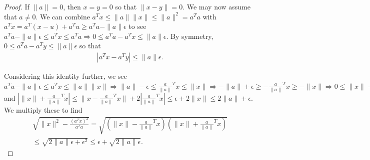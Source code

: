 \begin{proof}

If $\|a\| = 0$, then $x = y = 0$ so that $\|x - y\| = 0$.
We may now assume that $a \ne 0$.
We can combine
$
a^Tx  \le \|a\| \|x\| \le \|a\|^2 = a^T a
$
with
$
a^Tx = a^T(x - u) + a^T u \ge a^Ta - \|a\| \epsilon
$
to see
$
a^Ta - \|a\|\epsilon \le a^Tx \le a^Ta \Longrightarrow 0 \le a^Ta - a^Tx \le \|a\| \epsilon.
$
By symmetry, $0 \le a^Ta - a^Ty \le \|a\| \epsilon$ so that
\begin{align*}
\left| a^Tx - a^Ty \right| \le \|a\|\epsilon.
\end{align*}


% 
% 

Considering this identity further, we see
$
a^Ta - \|a\| \epsilon \le a^Tx \le \|a\|\|x\| 
\Longrightarrow \|a\| - \epsilon \le  \frac{a}{\|a\|}^T x \le \|x\| 
\Longrightarrow -\|a\| + \epsilon \ge  -\frac{a}{\|a\|}^T x \ge -\|x\| 
\Longrightarrow 0 \le \|x\| -\frac{a}{\|a\|}^T x \le \|x\|-\|a\| + \epsilon \le \epsilon
$
and
$
|\|x\| + \frac{a}{\|a\|}^T x| \le \|x - \frac{a}{\|a\|}^T x\| + 2|\frac{a}{\|a\|}^T x| \le \epsilon + 2\|x\| \le 2\|a\| + \epsilon
$.
We multiply these to find
\begin{align*}
\sqrt{\|x\|^2 - \frac{\left(a^Tx\right)^2}{a^Ta}}
= \sqrt{\left(\|x\| - \frac{a}{\|a\|}^Tx\right)\left(\|x\| + \frac{a}{\|a\|}^Tx\right)} \\
\le \sqrt{2\|a\|\epsilon + \epsilon^2} \le \epsilon + \sqrt{2\|a\|\epsilon}.
\end{align*}





\end{proof}
